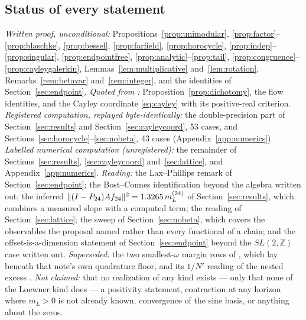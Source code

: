\subsection{Status of every statement}

\emph{Written proof, unconditional:} Propositions~\ref{prop:unimodular},
\ref{prop:factor}--\ref{prop:blaschke}, \ref{prop:bessel}, \ref{prop:farfield},
\ref{prop:horocycle}, \ref{prop:indep}--\ref{prop:singular},
\ref{prop:endpointfree}, \ref{prop:analytic}--\ref{prop:tail},
\ref{prop:congruence}--\ref{prop:cayleygalerkin},
Lemmas~\ref{lem:multiplicative} and~\ref{lem:rotation}, Remarks~\ref{rem:betavar} and~\ref{rem:integer},
and the identities of Section~\ref{sec:endpoint}.
\emph{Quoted from \cite{WilsonLines}:} Proposition~\ref{prop:dichotomy}, the
flow identities, and the Cayley coordinate \eqref{eq:cayley} with its
positive-real criterion. \emph{Registered computation, replayed
byte-identically:} the double-precision part of Section~\ref{sec:results} and
Section~\ref{sec:cayleycoord}, 53 cases, and
Sections~\ref{sec:horocycle}--\ref{sec:nobeta}, 43 cases
(Appendix~\ref{app:numerics}).
\emph{Labelled numerical computation (unregistered):} the remainder of
Sections~\ref{sec:results}, \ref{sec:cayleycoord} and~\ref{sec:lattice}, and
Appendix~\ref{app:numerics}. \emph{Reading:} the Lax--Phillips remark of
Section~\ref{sec:endpoint}; the Bost--Connes identification beyond the algebra
written out; the inferred $\lVert (I-P_{24})Af_{24}\rVert^2=1.3265\,m_L^{(24)}$ of
Section~\ref{sec:results}, which combines a measured slope with a computed term;
the reading of Section~\ref{sec:lattice}; the sweep of
Section~\ref{sec:nobeta}, which covers the observables the proposal named rather
than every functional of a chain; and the offset-is-a-dimension statement of
Section~\ref{sec:endpoint} beyond the $SL(2,\mathbb Z)$ case written out. \emph{Superseded:} the two
smallest-$\omega$ margin rows of \cite[Table~3.1]{ContractionNote}, which lay
beneath that note's own quadrature floor, and its $1/N'$ reading of the nested
excess \cite{RegisteredNote}. \emph{Not claimed:} that no realization of any kind
exists --- only that none of the Loewner kind does --- a positivity statement, contraction at any horizon where $m_L>0$ is not already
known, convergence of the sine basis, or anything about the zeros.
